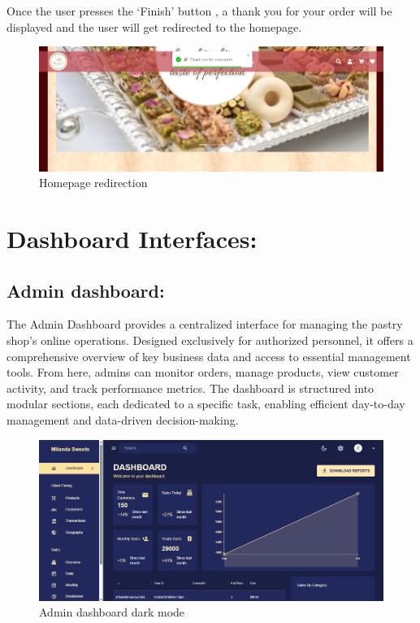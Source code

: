Once the user presses the ‘Finish’ button , a thank you for your order will be displayed and the user will get redirected to the homepage.

\begin{figure}[!h]
\begin{center}
\includegraphics{images/Homepage redirection.png}
\end{center}
\caption{Homepage redirection}
\end{figure}

\newpage
\section{Dashboard Interfaces:}

\subsection{Admin dashboard:}

The Admin Dashboard provides a centralized interface for managing the pastry shop’s online operations. Designed exclusively for authorized personnel, it offers a comprehensive overview of key business data and access to essential management tools. From here, admins can monitor orders, manage products, view customer activity, and track performance metrics. The dashboard is structured into modular sections, each dedicated to a specific task, enabling efficient day-to-day management and data-driven decision-making.

\begin{figure}[!h]
\begin{center}
\includegraphics{images/Admin dashboard dark mode.png}
\end{center}
\caption{Admin dashboard dark mode}
\end{figure}

